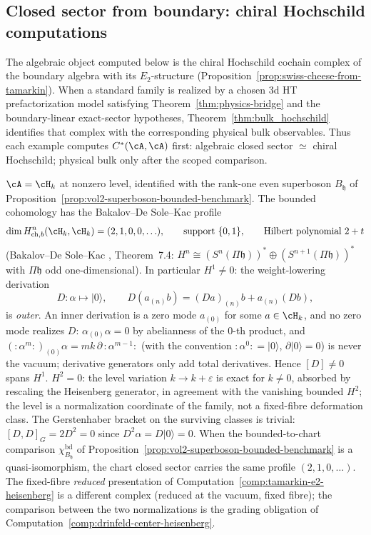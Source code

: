 \subsection{Closed sector from boundary: chiral Hochschild computations}
\label{subsec:bulk-from-boundary}

The algebraic object computed below is the chiral Hochschild cochain
complex of the boundary algebra with its $E_2$-structure
\textup{(}Proposition~\ref{prop:swiss-cheese-from-tamarkin}\textup{)}.
When a standard family is realized by a chosen 3d HT
prefactorization model satisfying Theorem~\ref{thm:physics-bridge}
and the boundary-linear exact-sector hypotheses, Theorem~\ref{thm:bulk_hochschild}
identifies that complex with the corresponding physical bulk
observables. Thus each example computes $C^*(\cA,\cA)$ first:
algebraic closed sector $\simeq$ chiral Hochschild; physical bulk only
after the scoped comparison.

\begin{computation}
\label{comp:bulk-heisenberg}
$\cA=\cH_k$ at nonzero level, identified with the rank-one even
superboson $B_{\mathfrak h}$ of
Proposition~\ref{prop:vol2-superboson-bounded-benchmark}. The
bounded cohomology has the Bakalov--De Sole--Kac profile
\[
 \dim H^n_{\mathrm{ch},b}(\cH_k,\cH_k)=(2,1,0,0,\ldots),
 \qquad
 \text{support }\{0,1\},\qquad
 \text{Hilbert polynomial } 2+t
\]
\textup{(}Bakalov--De Sole--Kac \cite{BDSK21}, Theorem~7.4:
$H^n\cong(S^n(\Pi\mathfrak h))^*\oplus(S^{n+1}(\Pi\mathfrak h))^*$
with $\Pi\mathfrak h$ odd one-dimensional\textup{)}. In particular
$H^1\neq0$: the weight-lowering derivation
\[
 D\colon \alpha\longmapsto|0\rangle,
 \qquad
 D(a_{(n)}b)=(Da)_{(n)}b+a_{(n)}(Db),
\]
is \emph{outer}. An inner derivation is a zero mode $a_{(0)}$ for
some $a\in\cH_k$, and no zero mode realizes $D$:
$\alpha_{(0)}\alpha=0$ by abelianness of the $0$-th product, and
$({:}\alpha^m{:})_{(0)}\alpha=mk\,\partial\,{:}\alpha^{m-1}{:}$
(with the convention ${:}\alpha^0{:}=|0\rangle$,
$\partial|0\rangle=0$) is never the vacuum; derivative generators
only add total derivatives. Hence $[D]\neq0$ spans $H^1$.
$H^2=0$: the level variation $k\to k+\varepsilon$ is exact for
$k\neq0$, absorbed by rescaling the Heisenberg generator, in
agreement with the vanishing bounded $H^2$; the level is a
normalization coordinate of the family, not a fixed-fibre
deformation class. The Gerstenhaber bracket on the surviving
classes is trivial: $[D,D]_G=2D^2=0$ since
$D^2\alpha=D|0\rangle=0$. When the bounded-to-chart comparison
$\chi^{\mathrm{bd}}_{B_{\mathfrak h}}$ of
Proposition~\ref{prop:vol2-superboson-bounded-benchmark} is a
quasi-isomorphism, the chart closed sector carries the same profile
$(2,1,0,\ldots)$. The fixed-fibre \emph{reduced} presentation of
Computation~\ref{comp:tamarkin-e2-heisenberg} is a different
complex (reduced at the vacuum, fixed fibre); the comparison
between the two normalizations is the grading obligation of
Computation~\ref{comp:drinfeld-center-heisenberg}.
\end{computation}

